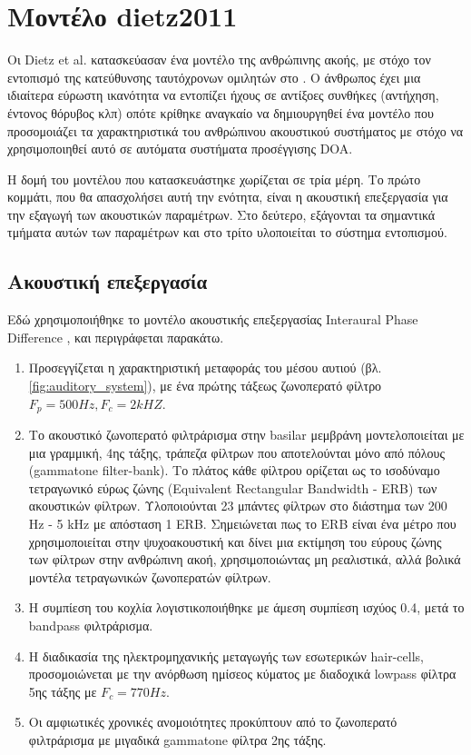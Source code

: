 \section{Μοντέλο dietz2011} \label{sec:dietz_theory}

Οι Dietz et al. κατασκεύασαν ένα μοντέλο της ανθρώπινης ακοής, με στόχο τον εντοπισμό της κατεύθυνσης ταυτόχρονων ομιλητών στο \cite{Dietz2011}. Ο άνθρωπος έχει μια ιδιαίτερα εύρωστη ικανότητα να εντοπίζει ήχους σε αντίξοες συνθήκες (αντήχηση, έντονος θόρυβος κλπ) οπότε κρίθηκε αναγκαίο να δημιουργηθεί ένα μοντέλο που προσομοιάζει τα χαρακτηριστικά του ανθρώπινου ακουστικού συστήματος με στόχο να χρησιμοποιηθεί αυτό σε αυτόματα συστήματα προσέγγισης DOA.

Η δομή του μοντέλου που κατασκευάστηκε χωρίζεται σε τρία μέρη. Το πρώτο κομμάτι, που θα απασχολήσει αυτή την ενότητα, είναι η ακουστική επεξεργασία για την εξαγωγή των ακουστικών παραμέτρων. Στο δεύτερο, εξάγονται τα σημαντικά τμήματα αυτών των παραμέτρων και στο τρίτο υλοποιείται το σύστημα εντοπισμού. 

\subsection{Ακουστική επεξεργασία}

Εδώ χρησιμοποιήθηκε το μοντέλο ακουστικής επεξεργασίας Interaural Phase Difference \cite{Dietz_2008}, και περιγράφεται παρακάτω.

\begin{enumerate}
    \item Προσεγγίζεται η χαρακτηριστική μεταφοράς του μέσου αυτιού (βλ. \ref{fig:auditory_system}), με ένα πρώτης τάξεως ζωνοπερατό φίλτρο $F_p = 500 Hz, F_c = 2 kHZ$.
    \item Το ακουστικό ζωνοπερατό φιλτράρισμα στην basilar μεμβράνη μοντελοποιείται με μια γραμμική, 4ης τάξης, τράπεζα φίλτρων που αποτελούνται μόνο από πόλους (gammatone filter-bank). Το πλάτος κάθε φίλτρου ορίζεται ως το ισοδύναμο τετραγωνικό εύρως ζώνης (Equivalent Rectangular Bandwidth - ERB) των ακουστικών φίλτρων. Υλοποιούνται 23 μπάντες φίλτρων στο διάστημα των 200 Hz - 5 kHz με απόσταση 1 ERB. Σημειώνεται πως το ERB είναι ένα μέτρο που χρησιμοποιείται στην ψυχοακουστική και δίνει μια εκτίμηση του εύρους ζώνης των φίλτρων στην ανθρώπινη ακοή, χρησιμοποιώντας μη ρεαλιστικά, αλλά βολικά μοντέλα τετραγωνικών ζωνοπερατών φίλτρων.
    \item Η συμπίεση του κοχλία λογιστικοποιήθηκε με άμεση συμπίεση ισχύος 0.4, μετά το bandpass φιλτράρισμα.
    \item Η διαδικασία της ηλεκτρομηχανικής μεταγωγής των εσωτερικών hair-cells, προσομοιώνεται με την ανόρθωση ημίσεος κύματος με διαδοχικά lowpass φίλτρα 5ης τάξης με $F_c = 770 Hz$.
    \item Οι αμφιωτικές χρονικές ανομοιότητες προκύπτουν από το ζωνοπερατό φιλτράρισμα με μιγαδικά gammatone φίλτρα 2ης τάξης.
\end{enumerate}{}

